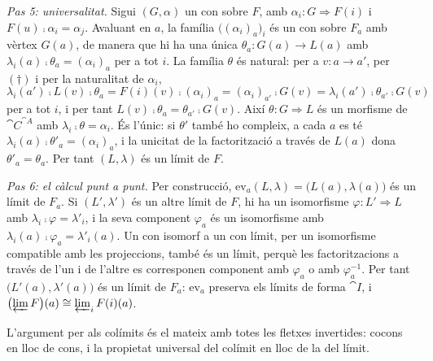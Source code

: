 \begin{prova}
\emph{Pas 5: universalitat.} Sigui $(G,\alpha)$ un con sobre $F$, amb $\alpha_i\colon G\Rightarrow F(i)$ i $F(u)\comp\alpha_i=\alpha_j$. Avaluant en $a$, la família $\bigl((\alpha_i)_a\bigr)_i$ és un con sobre $F_a$ amb vèrtex $G(a)$, de manera que hi ha una única $\theta_a\colon G(a)\to L(a)$ amb $\lambda_i(a)\comp\theta_a=(\alpha_i)_a$ per a tot $i$. La família $\theta$ és natural: per a $v\colon a\to a'$, per $(\dagger)$ i per la naturalitat de $\alpha_i$,
\[
\lambda_i(a')\comp L(v)\comp\theta_a=F(i)(v)\comp(\alpha_i)_a=(\alpha_i)_{a'}\comp G(v)=\lambda_i(a')\comp\theta_{a'}\comp G(v)
\]
per a tot $i$, i per tant $L(v)\comp\theta_a=\theta_{a'}\comp G(v)$. Així $\theta\colon G\Rightarrow L$ és un morfisme de $\cat{C}^{\cat{A}}$ amb $\lambda_i\comp\theta=\alpha_i$. És l'únic: si $\theta'$ també ho compleix, a cada $a$ es té $\lambda_i(a)\comp\theta'_a=(\alpha_i)_a$, i la unicitat de la factorització a través de $L(a)$ dona $\theta'_a=\theta_a$. Per tant $(L,\lambda)$ és un límit de $F$.

\emph{Pas 6: el càlcul punt a punt.} Per construcció, $\mathrm{ev}_a(L,\lambda)=\bigl(L(a),\lambda(a)\bigr)$ és un límit de $F_a$. Si $(L',\lambda')$ és un altre límit de $F$, hi ha un isomorfisme $\varphi\colon L'\Rightarrow L$ amb $\lambda_i\comp\varphi=\lambda'_i$, i la seva component $\varphi_a$ és un isomorfisme amb $\lambda_i(a)\comp\varphi_a=\lambda'_i(a)$. Un con isomorf a un con límit, per un isomorfisme compatible amb les projeccions, també és un límit, perquè les factoritzacions a través de l'un i de l'altre es corresponen component amb $\varphi_a$ o amb $\varphi_a^{-1}$. Per tant $\bigl(L'(a),\lambda'(a)\bigr)$ és un límit de $F_a$: $\mathrm{ev}_a$ preserva els límits de forma $\cat{I}$, i $\bigl(\varprojlim F\bigr)(a)\cong\varprojlim_i F(i)(a)$.

L'argument per als colímits és el mateix amb totes les fletxes invertides: cocons en lloc de cons, i la propietat universal del colímit en lloc de la del límit.
\end{prova}

